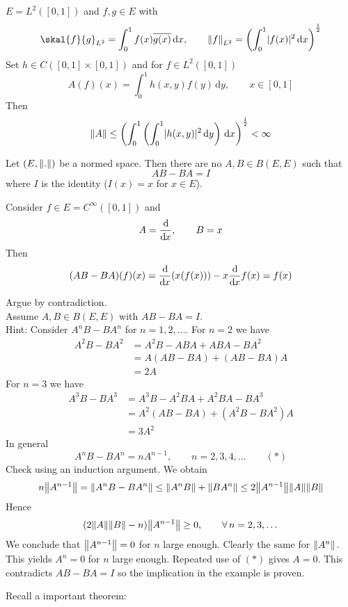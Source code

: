 \begin{beispiel}
	$E = L^2([0,1])$ and $f,g \in E$ with
	\[
		\skal{f}{g}_{L^2} = \int_{0}^{1} f(x) \overline{g(x)} \,\mathrm{d}x, \qquad \norm{f}_{L^2} = \left( \int_{0}^{1} \abs{f(x)}^2 \,\mathrm{d}x \right)^{\frac{1}{2}}
	\]
	Set $h \in C([0,1] \times [0,1])$ and for $f \in L^2([0,1])$
	\[
		A(f)(x) = \int_{0}^{1} h(x,y)f(y) \,\mathrm{d}y, \qquad x \in [0,1]
	\]
	Then
	\[
		\norm{A} \leq \left( \int_{0}^{1} \left( \int_{0}^{1} \abs{h(x,y)}^2 \,\mathrm{d}y \right) \,\mathrm{d}x \right)^{\frac{1}{2}} < \infty
	\]
\end{beispiel}
\begin{beispiel}
	Let $(E, \norm{.})$ be a normed space. Then there are no $A,B \in B(E,E)$ such that
	\[
		AB - BA = I
	\]
	where $I$ is the identity ($I(x)=x$ for $x \in E$).
	\begin{bemerkung}
		Consider $ f \in E = C^{\infty}([0,1])$ and 
		\[
			A = \frac{\mathrm{d}\mkern-1.0mu }{\mathrm{d}\mkern-1.0mu x} , \qquad B=x
		\]Then
		\[
			(AB - BA)(f)(x) = \frac{\mathrm{d}\mkern-1.0mu }{\mathrm{d}\mkern-1.0mu x} (x(f(x))) - x \frac{\mathrm{d}\mkern-1.0mu }{\mathrm{d}\mkern-1.0mu x} f(x) = f(x) 
		\]
	\end{bemerkung}
	Argue by contradiction. \\
	Assume $A,B \in B(E,E)$ with $AB-BA = I$. \\
	Hint: Consider $A^nB-BA^n$ for $n = 1,2,\dots$. For $n =2$ we have
	\begin{align*}
		A^2B-BA^2 &= A^2B-ABA + ABA - BA^2 \\
		&= A(AB-BA) + (AB-BA)A \\
		&= 2A
	\end{align*}
	For $n=3$ we have
	\begin{align*}
		A^3B-BA^3 &= A^3B-A^2BA + A^2BA - BA^3 \\
		&=A^2(AB-BA) + (A^2B-BA^2)A \\
		&= 3A^2
	\end{align*}
	In general 
	\[
		A^nB-BA^n = nA^{n-1}, \qquad n=2,3,4,\dots \qquad (*)
	\]
	Check using an induction argument. We obtain
	\[
		n \norm{A^{n-1}} = \norm{A^nB-BA^n} \leq \norm{A^nB} + \norm{BA^n} \leq  2 \norm{A^{n-1}} \norm{A} \norm{B}
	\]
	Hence \[
		(2 \norm{A} \norm{B} -n) \norm{A^{n-1}} \geq 0, \qquad  \forall\,  n = 2,3,\dots
	\]
	We conclude that $\norm{A^{n-1}}= 0$ for $n$ large enough. Clearly the same for $\norm{A^n}$. This yields $A^n=0$ for $n$ large enough. Repeated use of $(*)$ gives $A=0$. This contradicts $AB-BA= I$ so the implication in the example is proven.
\end{beispiel}

Recall a important theorem:

